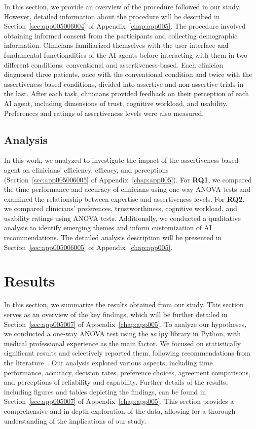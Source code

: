 In this section, we provide an overview of the procedure followed in our study.
However, detailed information about the procedure will be described in Section~\ref{sec:app005006004} of Appendix~\ref{chap:app005}.
The procedure involved obtaining informed consent from the participants and collecting demographic information.
Clinicians familiarized themselves with the user interface and fundamental functionalities of the \ac{AI} agents before interacting with them in two different conditions: conventional and assertiveness-based.
Each clinician diagnosed three patients, once with the conventional condition and twice with the assertiveness-based conditions, divided into assertive and non-assertive trials in the last.
After each task, clinicians provided feedback on their perception of each \ac{AI} agent, including dimensions of trust, cognitive workload, and usability.
Preferences and ratings of assertiveness levels were also measured.

\subsection{Analysis}
\label{sec:chap006005005}

In this work, we analyzed to investigate the impact of the assertiveness-based agent on clinicians' efficiency, efficacy, and perceptions (Section~\ref{sec:app005006005} of Appendix~\ref{chap:app005}).
For {\bf RQ1}, we compared the time performance and accuracy of clinicians using one-way \ac{ANOVA} tests and examined the relationship between expertise and assertiveness levels.
For {\bf RQ2}, we compared clinicians' preferences, trustworthiness, cognitive workload, and usability ratings using \ac{ANOVA} tests.
Additionally, we conducted a qualitative analysis to identify emerging themes and inform customization of \ac{AI} recommendations.
The detailed analysis description will be presented in Section~\ref{sec:app005006005} of Appendix~\ref{chap:app005}.

\section{Results}
\label{sec:chap006006}

In this section, we summarize the results obtained from our study.
This section serves as an overview of the key findings, which will be further detailed in Section~\ref{sec:app005007} of Appendix~\ref{chap:app005}.
To analyze our hypotheses, we conducted a one-way \ac{ANOVA} test using the \texttt{scipy} library in Python, with medical professional experience as the main factor.
We focused on statistically significant results and selectively reported them, following recommendations from the literature~\cite{CASALE2022107302}.
Our analysis explored various aspects, including time performance, accuracy, decision rates, preference choices, agreement comparisons, and perceptions of reliability and capability.
Further details of the results, including figures and tables depicting the findings, can be found in Section~\ref{sec:app005007} of Appendix~\ref{chap:app005}.
This section provides a comprehensive and in-depth exploration of the data, allowing for a thorough understanding of the implications of our study.

